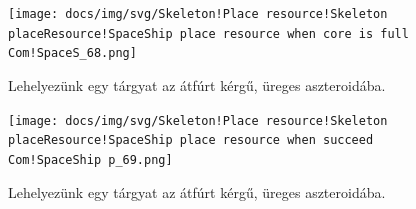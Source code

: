 \begin{figure}[H] 
\centering 
\texttt{[image: docs/img/svg/Skeleton!Place resource!Skeleton placeResource!SpaceShip place resource when core is full Com!SpaceS\_68.png]} 
\caption{Lehelyezünk egy tárgyat az átfúrt kérgű, üreges aszteroidába.} 
\end{figure} 

\begin{figure}[H] 
\centering 
\texttt{[image: docs/img/svg/Skeleton!Place resource!Skeleton placeResource!SpaceShip place resource when succeed Com!SpaceShip p\_69.png]} 
\caption{Lehelyezünk egy tárgyat az átfúrt kérgű, üreges aszteroidába.} 
\end{figure} 

